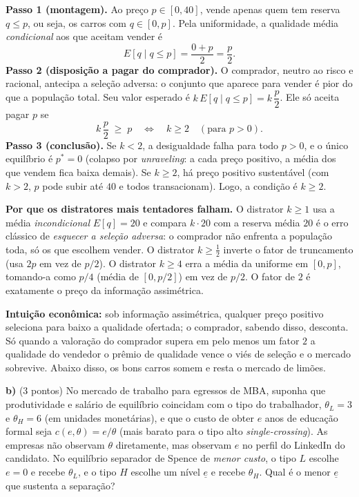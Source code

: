 \begin{solucao}
\textbf{Passo 1 (montagem).} Ao pre\c{c}o $p \in [0,40]$, vende apenas quem tem reserva $q \le p$, ou seja, os carros com $q \in [0,p]$. Pela uniformidade, a qualidade m\'edia \emph{condicional} aos que aceitam vender \'e
\[
E[q \mid q \le p] = \frac{0+p}{2} = \frac{p}{2}.
\]
\textbf{Passo 2 (disposi\c{c}\~ao a pagar do comprador).} O comprador, neutro ao risco e racional, antecipa a sele\c{c}\~ao adversa: o conjunto que aparece para vender \'e pior do que a popula\c{c}\~ao total. Seu valor esperado \'e $k\,E[q\mid q\le p] = k\,\dfrac{p}{2}$. Ele s\'o aceita pagar $p$ se
\[
k\,\frac{p}{2} \;\ge\; p \quad\Longleftrightarrow\quad k \ge 2 \quad(\text{para } p>0).
\]
\textbf{Passo 3 (conclus\~ao).} Se $k<2$, a desigualdade falha para todo $p>0$, e o \'unico equil\'ibrio \'e $p^*=0$ (colapso por \emph{unraveling}: a cada pre\c{c}o positivo, a m\'edia dos que vendem fica baixa demais). Se $k \ge 2$, h\'a pre\c{c}o positivo sustent\'avel (com $k>2$, $p$ pode subir at\'e $40$ e todos transacionam). Logo, a condi\c{c}\~ao \'e $k \ge 2$.

\textbf{Por que os distratores mais tentadores falham.} O distrator $k \ge 1$ usa a m\'edia \emph{incondicional} $E[q]=20$ e compara $k\cdot 20$ com a reserva m\'edia $20$ \textemdash{} \'e o erro cl\'assico de \emph{esquecer a sele\c{c}\~ao adversa}: o comprador n\~ao enfrenta a popula\c{c}\~ao toda, s\'o os que escolhem vender. O distrator $k \ge \tfrac{1}{2}$ inverte o fator de truncamento (usa $2p$ em vez de $p/2$). O distrator $k \ge 4$ erra a m\'edia da uniforme em $[0,p]$, tomando-a como $p/4$ (m\'edia de $[0,p/2]$) em vez de $p/2$. O fator de $2$ \'e exatamente o pre\c{c}o da informa\c{c}\~ao assim\'etrica.

\textbf{Intui\c{c}\~ao econ\^omica:} sob informa\c{c}\~ao assim\'etrica, qualquer pre\c{c}o positivo seleciona para baixo a qualidade ofertada; o comprador, sabendo disso, desconta. S\'o quando a valora\c{c}\~ao do comprador supera em pelo menos um fator $2$ a qualidade do vendedor o pr\^emio de qualidade vence o vi\'es de sele\c{c}\~ao e o mercado sobrevive. Abaixo disso, os bons carros somem e resta o mercado de lim\~oes.
\end{solucao}

\textbf{b)} (3 pontos) No mercado de trabalho para egressos de MBA, suponha que produtividade e sal\'ario de equil\'ibrio coincidam com o tipo do trabalhador, $\theta_L = 3$ e $\theta_H = 6$ (em unidades monet\'arias), e que o custo de obter $e$ anos de educa\c{c}\~ao formal seja $c(e,\theta) = e/\theta$ (mais barato para o tipo alto \textemdash{} \emph{single-crossing}). As empresas n\~ao observam $\theta$ diretamente, mas observam $e$ no perfil do LinkedIn do candidato. No equil\'ibrio separador de Spence de \emph{menor custo}, o tipo $L$ escolhe $e=0$ e recebe $\theta_L$, e o tipo $H$ escolhe um n\'ivel $\underline{e}$ e recebe $\theta_H$. Qual \'e o menor $\underline{e}$ que sustenta a separa\c{c}\~ao?

